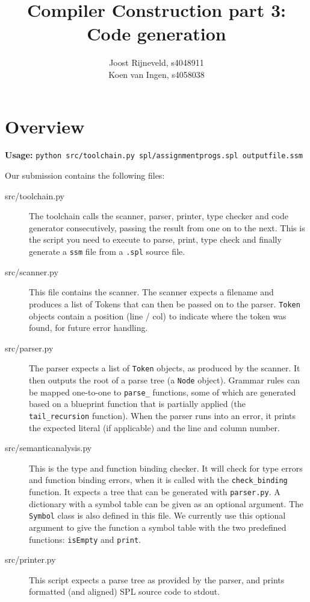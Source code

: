 \documentclass[a4paper]{article}
\title{Compiler Construction part 3: Code generation}
\author{Joost Rijneveld, s4048911\\Koen van Ingen, s4058038}
\date{}
\begin{document}
\maketitle

\section{Overview}
{\bf Usage:} {\tt python src/toolchain.py spl/assignmentprogs.spl outputfile.ssm}

Our submission contains the following files:

\begin{description}
        \item[src/toolchain.py] The toolchain calls the scanner, parser, printer, type checker and code generator consecutively, passing the result from one on to the next. This is the script you need to execute to parse, print, type check and finally generate a {\tt ssm} file from a {\tt .spl} source file.
        \item[src/scanner.py] This file contains the scanner. The scanner expects a filename and produces a list of Tokens that can then be passed on to the parser. {\tt Token} objects contain a position (line / col) to indicate where the token was found, for future error handling.
        \item[src/parser.py] The parser expects a list of {\tt Token} objects, as produced by the scanner. It then outputs the root of a parse tree (a {\tt Node} object). Grammar rules can be mapped one-to-one to {\tt parse\_} functions, some of which are generated based on a blueprint function that is partially applied (the {\tt tail\_recursion} function). When the parser runs into an error, it prints the expected literal (if applicable) and the line and column number.
        \item[src/semanticanalysis.py] This is the type and function binding checker. It will check for type errors and function binding errors, when it is called with the {\tt check\_binding} function. It expects a tree that can be generated with {\tt parser.py}. A dictionary with a symbol table can be given as an optional argument. The {\tt Symbol} class is also defined in this file. We currently use this optional argument to give the function a symbol table with the two predefined functions: {\tt isEmpty} and {\tt print}. 
        \item[src/printer.py] This script expects a parse tree as provided by the parser, and prints formatted (and aligned) SPL source code to stdout.

\end{description}
\end{document}
